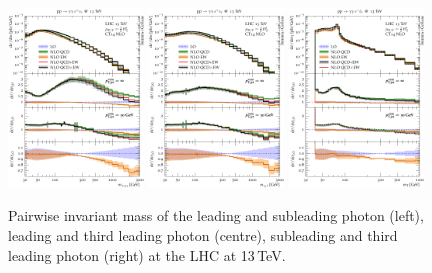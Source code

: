 \begin{figure}[t!]
  \centering
  \includegraphics[width=0.32\textwidth]{figs_aaw/m_y1y2_comb_log}
  \includegraphics[width=0.32\textwidth]{figs_aaw/m_y1l1_comb_log}
  \includegraphics[width=0.32\textwidth]{figs_aaw/m_t_comb_log}
  \caption{
    Pairwise invariant mass of the leading and subleading photon (left),
    leading and third leading photon (centre), subleading and third leading 
    photon (right) at the LHC at 13\,TeV.\\
    \label{fig:aaw:myy}
  }
\end{figure}

